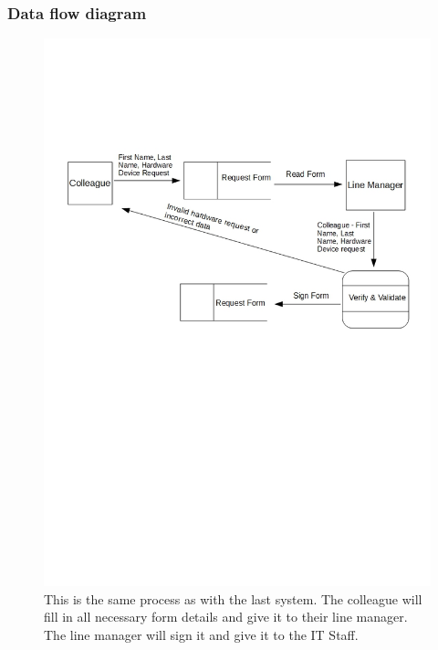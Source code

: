 \subsubsection{Data flow diagram}

\begin{figure}[H]
\includegraphics[width=\textwidth]{CurrentDFD.jpg}
\caption{This is the same process as with the last system. The colleague will fill in all necessary form details and give it to their line manager. The line manager will sign it and give it to the IT Staff.} \label{Page1Interview}
\end{figure}

